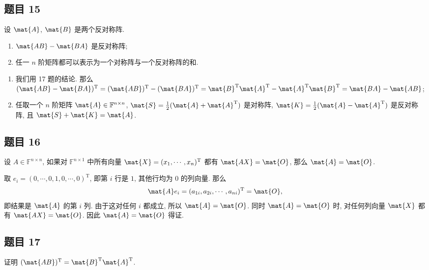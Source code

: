 \subsection*{题目 15}
\begin{problem*}
设 $\mat{A}$, $\mat{B}$ 是两个反对称阵.
\begin{enumerate}
    \item $\mat{AB} - \mat{BA}$ 是反对称阵;
    \item 任一 $n$ 阶矩阵都可以表示为一个对称阵与一个反对称阵的和.
\end{enumerate}
\end{problem*}
\begin{solution}
\begin{enumerate}
    \item 我们用 17 题的结论. 那么 $(\mat{AB} - \mat{BA})^{\mathrm{T}} = (\mat{AB})^{\mathrm{T}} - (\mat{BA})^{\mathrm{T}} = \mat{B}^{\mathrm{T}}\mat{A}^{\mathrm{T}} - \mat{A}^{\mathrm{T}}\mat{B}^{\mathrm{T}} = \mat{BA} - \mat{AB}$;
    \item 任取一个 $n$ 阶矩阵 $\mat{A} \in \mathbb{F}^{n \times n}$, $\mat{S} = \frac{1}{2}(\mat{A} + \mat{A}^{\mathrm{T}})$ 是对称阵, $\mat{K} = \frac{1}{2}(\mat{A} - \mat{A}^{\mathrm{T}})$ 是反对称阵, 且 $\mat{S} + \mat{K} = \mat{A}$.
\end{enumerate}
\end{solution}

\subsection*{题目 16}
\begin{problem*}
设 $A \in \mathbb{F}^{n \times n}$, 如果对 $\mathbb{F}^{n \times 1}$ 中所有向量 $\mat{X} = (x_1, \cdots, x_n)^{\mathrm{T}}$ 都有 $\mat{AX} = \mat{O}$, 那么 $\mat{A} = \mat{O}$.
\end{problem*}
\begin{solution}
取 $e_i = (0, \cdots, 0, 1, 0, \cdots, 0)^{\mathrm{T}}$, 即第 $i$ 行是 $1$, 其他行均为 $0$ 的列向量. 那么
\[
\mat{A}e_i = (a_{1i}, a_{2i}, \cdots, a_{ni})^{\mathrm{T}} = \mat{O},
\]
即结果是 $\mat{A}$ 的第 $i$ 列. 由于这对任何 $i$ 都成立, 所以 $\mat{A} = \mat{O}$. 同时 $\mat{A} = \mat{O}$ 时, 对任何列向量 $\mat{X}$ 都有 $\mat{AX} = \mat{O}$. 因此 $\mat{A} = \mat{O}$ 得证.
\end{solution}

\subsection*{题目 17}
\begin{problem}
证明 $(\mat{AB})^{\mathrm{T}} = \mat{B}^{\mathrm{T}} \mat{A}^{\mathrm{T}}$.
\end{problem}

